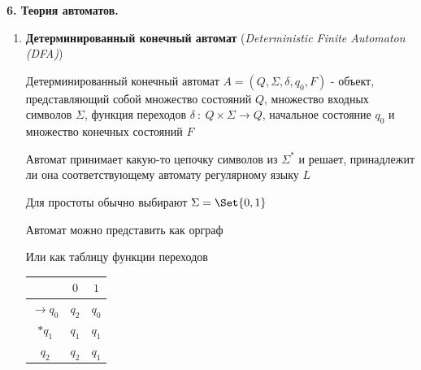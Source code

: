 \documentclass[12pt]{article}
\begin{document}
    \begin{center}
        \textbf{6. Теория автоматов.}
    \end{center}


    \begin{enumerate}
        \item \textbf{Детерминированный конечный автомат} (\textit{Deterministic Finite Automaton (DFA)})

        Детерминированный конечный автомат $A = (Q, \Sigma, \delta, q_0, F)$ - объект, представляющий собой множество состояний $Q$, множество входных символов $\Sigma$,
        функция переходов $\delta \ : \ Q \times \Sigma \to Q$, начальное состояние $q_0$ и множество конечных состояний $F$

        Автомат принимает какую-то цепочку символов из $\Sigma^*$ и решает, принадлежит ли она соответствующему автомату регулярному языку $L$

        Для простоты обычно выбирают $\Sigma = \Set{0, 1}$

        Автомат можно представить как орграф


        Или как таблицу функции переходов

        \begin{tabular}{c|cc}
            & $0$   & $1$   \\
            \hline
            $\to q_0$ & $q_2$ & $q_0$ \\
            \hline
            $*q_1$    & $q_1$ & $q_1$ \\
            \hline
            $q_2$     & $q_2$ & $q_1$
        \end{tabular}


\end{enumerate}
\end{document}
